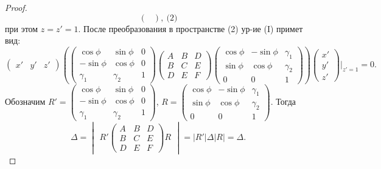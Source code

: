 \begin{proof}
\[\begin{pmatrix}
            \end{pmatrix}, \ \text{(2)}\]
        при этом $z = z' = 1$. После преобразования в пространстве (2) ур-ие (I) примет вид:
        \[\begin{pmatrix}
            x' & y' & z'
        \end{pmatrix} \left(\begin{pmatrix}
            \cos\phi & \sin\phi & 0 \\
            -\sin\phi & \cos\phi & 0 \\
            \gamma_1 & \gamma_2 & 1
        \end{pmatrix} \begin{pmatrix}
            A & B & D \\
            B & C & E \\
            D & E & F
        \end{pmatrix} \begin{pmatrix}
            \cos\phi & -\sin\phi & \gamma_1 \\
            \sin\phi & \cos\phi & \gamma_2 \\
            0 & 0 & 1
        \end{pmatrix}\right) \begin{pmatrix}
            x' \\
            y' \\
            z'
        \end{pmatrix}\bigg|_{z' = 1} = 0.\]
        Обозначим $R' = \begin{pmatrix}
            \cos\phi & \sin\phi & 0 \\
            -\sin\phi & \cos\phi & 0 \\
            \gamma_1 & \gamma_2 & 1
        \end{pmatrix}$, $R = \begin{pmatrix}
            \cos\phi & -\sin\phi & \gamma_1 \\
            \sin\phi & \cos\phi & \gamma_2 \\
            0 & 0 & 1
        \end{pmatrix}$. Тогда
        \[\Delta = \begin{vmatrix}
            R' \begin{pmatrix}
                A & B & D \\
                B & C & E \\
                D & E & F
            \end{pmatrix} R
        \end{vmatrix} = |R'|\Delta |R| = \Delta.\]

\end{proof}
